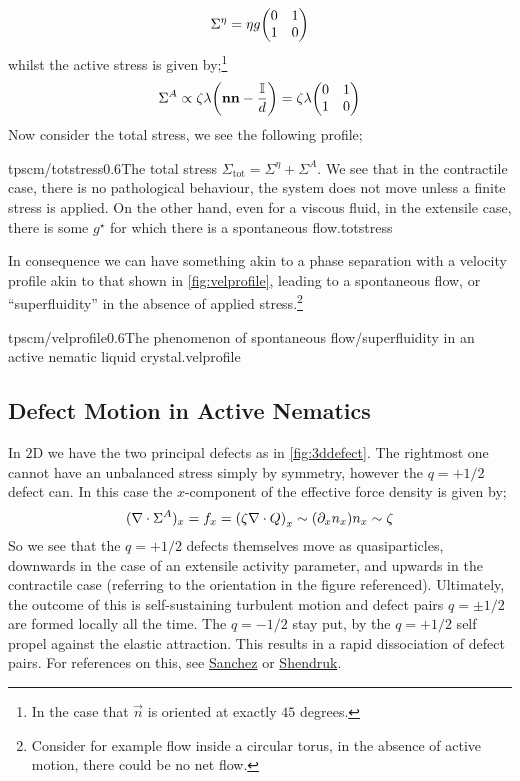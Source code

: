 \begin{equation*}
\Sigma^{\eta} = \eta g \twobytwo{0}{1}{1}{0}
\end{equation*}
whilst the active stress is given by;\footnote{In the case that $\vec{n}$ is oriented at exactly $45$ degrees.}
\begin{equation*}
\Sigma^{A} \propto \zeta \lambda \left(\vec{n}\vec{n} - \frac{\mathbb{I}}{d}\right) = \zeta \lambda\twobytwo{0}{1}{1}{0}
\end{equation*}
Now consider the total stress, we see the following profile;
\begin{mygraphic}{tpscm/totstress}{0.6}{The total stress $\Sigma_{\text{tot}} = \Sigma^{\eta} + \Sigma^{A}$. We see that in the contractile case, there is no pathological behaviour, the system does not move unless a finite stress is applied. On the other hand, even for a viscous fluid, in the extensile case, there is some $g^{\star}$ for which there is a spontaneous flow.}{totstress}\end{mygraphic}
In consequence we can have something akin to a phase separation with a velocity profile akin to that shown in \autoref{fig:velprofile}, leading to a spontaneous flow, or ``superfluidity'' in the absence of applied stress.\footnote{Consider for example flow inside a circular torus, in the absence of active motion, there could be no net flow.}
\begin{mygraphic}{tpscm/velprofile}{0.6}{The phenomenon of spontaneous flow/superfluidity in an active nematic liquid crystal.}{velprofile}\end{mygraphic}
\subsection{Defect Motion in Active Nematics}
In $2$D we have the two principal defects as in \autoref{fig:3ddefect}. The rightmost one cannot have an unbalanced stress simply by symmetry, however the $q = +1/2$ defect can. In this case the $x$-component of the effective force density is given by;
\begin{equation*}
(\nabla \cdot \Sigma^{A})_x = f_x = \left(\zeta \nabla \cdot Q\right)_x \sim(\del_x n_x)n_x \sim \zeta
\end{equation*}
So we see that the $q = +1/2$ defects themselves move as quasiparticles, downwards in the case of an extensile activity parameter, and upwards in the contractile case (referring to the orientation in the figure referenced). Ultimately, the outcome of this is self-sustaining turbulent motion and defect pairs $q = \pm 1/2$ are formed locally all the time. The $q = -1/2$ stay put, by the $q = +1/2$ self propel against the elastic attraction. This results in a rapid dissociation of defect pairs. For references on this, see \href{https://www.nature.com/articles/nature11591}{Sanchez} or \href{http://pubs.rsc.org/en/content/articlepdf/2017/sm/c6sm02310j}{Shendruk}.
















